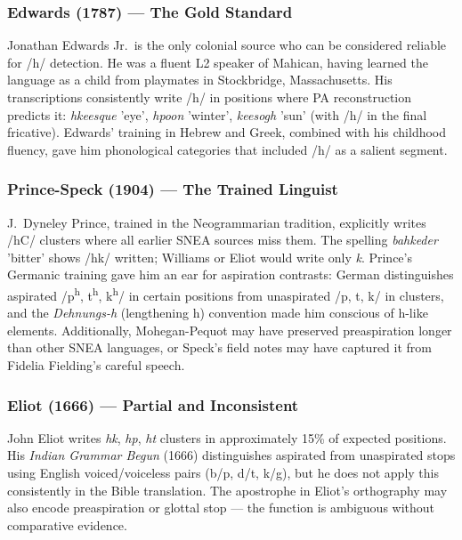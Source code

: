 \subsubsection{Edwards (1787) --- The Gold Standard}

Jonathan Edwards Jr.\ is the only colonial source who can be considered
reliable for /h/ detection. He was a fluent L2 speaker of Mahican, having
learned the language as a child from playmates in Stockbridge, Massachusetts.
His transcriptions consistently write /h/ in positions where PA
reconstruction predicts it: \textit{hkeesque} 'eye', \textit{hpoon} 'winter',
\textit{keesogh} 'sun' (with /h/ in the final fricative). Edwards' training
in Hebrew and Greek, combined with his childhood fluency, gave him
phonological categories that included /h/ as a salient segment.

\subsubsection{Prince-Speck (1904) --- The Trained Linguist}

J.\ Dyneley Prince, trained in the Neogrammarian tradition, explicitly writes
/hC/ clusters where all earlier SNEA sources miss them. The spelling
\textit{bahkeder} 'bitter' shows /hk/ written; Williams or Eliot would write
only \textit{k}. Prince's Germanic training gave him an ear for aspiration
contrasts: German distinguishes aspirated /p\textsuperscript{h}, t\textsuperscript{h},
k\textsuperscript{h}/ in certain positions from unaspirated /p, t, k/ in
clusters, and the \textit{Dehnungs-h} (lengthening h) convention made him
conscious of h-like elements. Additionally, Mohegan-Pequot may have preserved
preaspiration longer than other SNEA languages, or Speck's field notes may
have captured it from Fidelia Fielding's careful speech.

\subsubsection{Eliot (1666) --- Partial and Inconsistent}

John Eliot writes \textit{hk}, \textit{hp}, \textit{ht} clusters in
approximately 15\% of expected positions. His \textit{Indian Grammar Begun}
(1666) distinguishes aspirated from unaspirated stops using English
voiced/voiceless pairs (b/p, d/t, k/g), but he does not apply this
consistently in the Bible translation. The apostrophe in Eliot's orthography
may also encode preaspiration or glottal stop --- the function is ambiguous
without comparative evidence.

